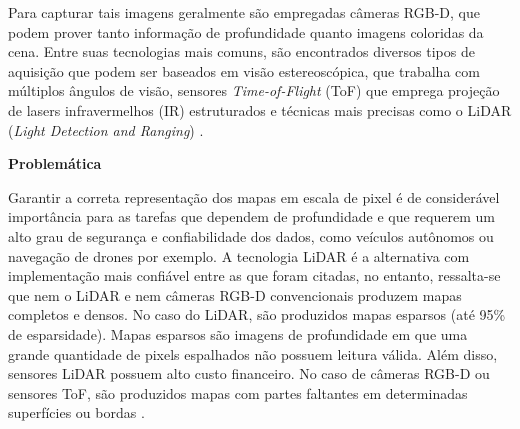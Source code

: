 Para capturar tais imagens geralmente são empregadas câmeras RGB-D, que podem prover tanto informação de profundidade quanto imagens coloridas da cena. Entre suas tecnologias mais comuns, são encontrados diversos tipos de aquisição que podem ser baseados em visão estereoscópica, que trabalha com múltiplos ângulos de visão, sensores \textit{Time-of-Flight} (ToF) que emprega projeção de lasers infravermelhos (IR) estruturados e técnicas mais precisas como o LiDAR (\textit{Light Detection and Ranging}) \cite{castellano2023performance}.






\textbf{Problemática} 

Garantir a correta representação dos mapas em escala de pixel é de considerável importância para as tarefas que dependem de profundidade e que requerem um alto grau de segurança e confiabilidade dos dados, como veículos autônomos ou navegação de drones por exemplo. A tecnologia LiDAR é a alternativa com implementação mais confiável entre as que foram citadas, no entanto, ressalta-se que nem o LiDAR e nem câmeras RGB-D convencionais produzem mapas completos e densos. No caso do LiDAR, são produzidos mapas esparsos (até 95\% de esparsidade). Mapas esparsos são imagens de profundidade em que uma grande quantidade de pixels espalhados não possuem leitura válida. Além disso, sensores LiDAR possuem alto custo financeiro. No caso de câmeras RGB-D ou sensores ToF, são produzidos mapas com partes faltantes em determinadas superfícies ou bordas \cite{hu2012robust}. 







